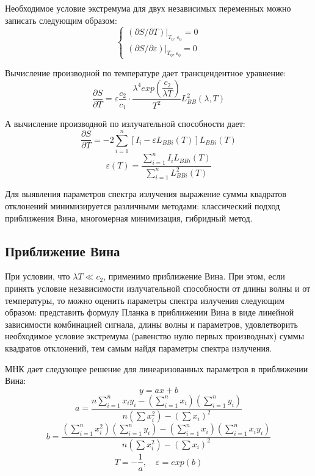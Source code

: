 Необходимое условие экстремума для двух независимых переменных можно записать следующим образом:
\begin{equation}
\begin{cases}
    (\partial S / \partial T)|_{T_0, \varepsilon_0} = 0
    \\
    (\partial S / \partial \varepsilon)|_{T_0, \varepsilon_0} = 0
\end{cases}  
\end{equation}

Вычисление производной по температуре дает трансцендентное уравнение:
\begin{equation}
\label{eq::dsdt}
    \dfrac{\partial S}{\partial T} = \varepsilon \dfrac{c_2}{c_1} \cdot \dfrac{\lambda^4 exp(\dfrac{c_2}{\lambda T})}{T^2} L_{BB}^2 (\lambda, T)
\end{equation}

А вычисление производной по излучательной способности дает:
\begin{equation*}
    \dfrac{\partial S}{\partial T} = -2 \sum\limits_{i=1}^n [I_i - \varepsilon L_{BBi}(T)] L_{BBi}(T)
\end{equation*}
\begin{equation}
\label{eq::emissivity}
    \varepsilon(T) = \dfrac{\sum_{i=1}^n I_i L_{BBi}(T)}{\sum_{i=1}^n L_{BBi}^2(T)}
\end{equation}

Для выявления параметров спектра излучения выражение суммы квадратов отклонений минимизируется различными методами: классический подход приближения Вина, многомерная минимизация, гибридный метод.

\subsection{Приближение Вина}
При условии, что $\lambda T \ll c_2$, применимо приближение Вина. При этом, если принять условие независимости излучательной способности от длины волны и от температуры, то можно оценить параметры спектра излучения следующим образом: представить формулу Планка в приближении Вина в виде линейной зависимости комбинацией сигнала, длины волны и параметров, удовлетворить необходимое условие экстремума (равенство нулю первых производных) суммы квадратов отклонений, тем самым найдя параметры спектра излучения.

МНК дает следующее решение для линеаризованных параметров в приближении Вина:
\begin{equation*}
    y = a x + b
\end{equation*}
\begin{equation*}
    a = \dfrac{n \sum_{i=1}^n x_i y_i - (\sum_{i=1}^n x_i)(\sum_{i=1}^n y_i)}{n (\sum x_i^2) - (\sum x_i)^2}
\end{equation*}
\begin{equation}
    b = \dfrac{(\sum_{i=1}^n x_i^2) (\sum_{i=1}^n y_i) - (\sum_{i=1}^n x_i) (\sum_{i=1}^n x_i y_i)}{n (\sum x_i^2) - (\sum x_i)^2}
\end{equation}
\begin{eqnarray*}
    T = -\dfrac{1}{a}, \quad \varepsilon = exp(b)
\end{eqnarray*}

